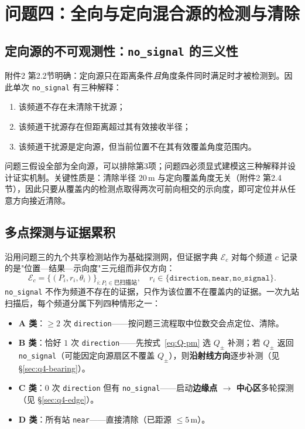\documentclass[12pt,a4paper]{ctexart}
\begin{document}
\section{问题四：全向与定向混合源的检测与清除}

\subsection{定向源的不可观测性：\texttt{no\_signal} 的三义性}
\label{sec:q4-ambiguity}
附件2 第2.2节明确：定向源只在距离条件\emph{且}角度条件同时满足时才被检测到。因此单次 \texttt{no\_signal} 有三种解释：
\begin{enumerate}
  \item 该频道不存在未清除干扰源；
  \item 该频道干扰源存在但距离超过其有效接收半径；
  \item 该频道干扰源是定向源，但当前位置不在其有效覆盖角度范围内。
\end{enumerate}
问题三假设全部为全向源，可以排除第3项；问题四必须显式建模这三种解释并设计证实机制。关键性质是：清除半径 $20\,\mathrm{m}$ 与定向覆盖角度无关（附件2 第2.4节），因此只要从覆盖内的检测点取得两次可前向相交的示向度，即可定位并从任意方向接近清除。

\subsection{多点探测与证据累积}
\label{sec:q4-evidence}
沿用问题三的九个共享检测站作为基础探测网，但证据字典 $\mathcal E_c$ 对每个频道 $c$ 记录的是"位置—结果—示向度"三元组而非仅方向：
\[
 \mathcal E_c=\{(P_i,r_i,\theta_i)\}_{i:P_i\in\text{已扫描站}},\quad
 r_i\in\{\texttt{direction},\texttt{near},\texttt{no\_signal}\}.
\]
\texttt{no\_signal} 不作为频道不存在的证据，只作为该位置不在覆盖内的证据。一次九站扫描后，每个频道分属下列四种情形之一：
\begin{itemize}
  \item \textbf{A 类}：$\ge2$ 次 \texttt{direction}——按问题三流程取中位数交会点定位、清除。
  \item \textbf{B 类}：恰好 $1$ 次 \texttt{direction}——先按式~\eqref{eq:Q-pm} 选 $Q_\pm$ 补测；若 $Q_\pm$ 返回 \texttt{no\_signal}（可能因定向源扇区不覆盖 $Q_\pm$），则\textbf{沿射线方向}逐步补测（见 \S\ref{sec:q4-bearing}）。
  \item \textbf{C 类}：$0$ 次 \texttt{direction} 但有 \texttt{no\_signal}——启动\textbf{边缘点 $\to$ 中心区}多轮探测（见 \S\ref{sec:q4-edge}）。
  \item \textbf{D 类}：所有站 \texttt{near}——直接清除（已距源 $\le5\,\mathrm{m}$）。
\end{itemize}
\end{document}
